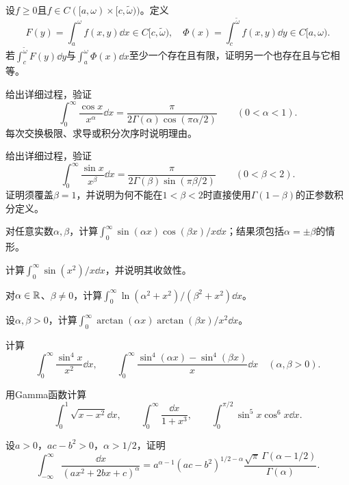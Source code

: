 设$f\ge0$且$f\in C([a,\omega)\times[c,\widetilde\omega))$。定义
\[
 F(y)=\int_a^\omega f(x,y)\dd x\in C[c,\widetilde\omega),\quad
 \Phi(x)=\int_c^{\widetilde\omega} f(x,y)\dd y\in C[a,\omega).
\]
若$\int_c^{\widetilde\omega}F(y)\dd y$与$\int_a^\omega\Phi(x)\dd x$至少一个存在且有限，证明另一个也存在且与它相等。

给出详细过程，验证
\[
 \int_0^\infty\frac{\cos x}{x^\alpha}\dd x
 =\frac{\pi}{2\Gamma(\alpha)\cos(\pi\alpha/2)}\qquad(0<\alpha<1).
\]
每次交换极限、求导或积分次序时说明理由。

给出详细过程，验证
\[
 \int_0^\infty\frac{\sin x}{x^\beta}\dd x
 =\frac{\pi}{2\Gamma(\beta)\sin(\pi\beta/2)}\qquad(0<\beta<2).
\]
证明须覆盖$\beta=1$，并说明为何不能在$1<\beta<2$时直接使用$\Gamma(1-\beta)$的正参数积分定义。

对任意实数$\alpha,\beta$，计算$\int_0^\infty\sin(\alpha x)\cos(\beta x)/x\dd x$；结果须包括$\alpha=\pm\beta$的情形。

计算$\int_0^\infty\sin(x^2)/x\dd x$，并说明其收敛性。

对$\alpha\in\mathbb R$、$\beta\ne0$，计算$\int_0^\infty\ln(\alpha^2+x^2)/(\beta^2+x^2)\dd x$。

设$\alpha,\beta>0$，计算$\int_0^\infty\arctan(\alpha x)\arctan(\beta x)/x^2\dd x$。

计算
\[
 \int_0^\infty\frac{\sin^4x}{x^2}\dd x,\qquad
 \int_0^\infty\frac{\sin^4(\alpha x)-\sin^4(\beta x)}x\dd x
 \quad(\alpha,\beta>0).
\]

用Gamma函数计算
\[
 \int_0^1\sqrt{x-x^2}\dd x,\qquad
 \int_0^\infty\frac{\dd x}{1+x^3},\qquad
 \int_0^{\pi/2}\sin^5x\cos^6x\dd x.
\]

设$a>0$，$ac-b^2>0$，$\alpha>1/2$，证明
\[
 \int_{-\infty}^\infty\frac{\dd x}{(ax^2+2bx+c)^\alpha}
 =a^{\alpha-1}(ac-b^2)^{1/2-\alpha}
   \frac{\sqrt\pi\,\Gamma(\alpha-1/2)}{\Gamma(\alpha)}.
\]

